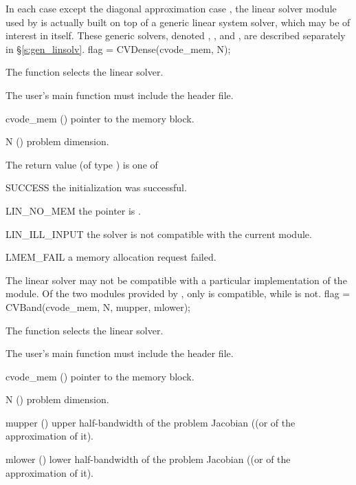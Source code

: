 In each case except the diagonal approximation case {\cvdiag}, the linear
solver module used by {\cvodes} is actually built on top of a generic
linear system solver, which may be of interest in itself.  These
generic solvers, denoted {\dense}, {\band}, and {\spgmr}, are described
separately in \S\ref{s:gen_linsolv}.
{flag = CVDense(cvode\_mem, N);}
{
  The function  selects the {\cvdense} linear solver. 

  The user's main function must include the  header file.
}
{
  \begin{args}
  \item[cvode\_mem] ()
    pointer to the {\cvodes} memory block.
  \item[N] ()
    problem dimension.
  \end{args}
}
{
  The return value  (of type ) is one of
  \begin{args}
  \item[SUCCESS] 
    the {\cvdense} initialization was successful.
  \item[LIN\_NO\_MEM]
    the  pointer is .
  \item[LIN\_ILL\_INPUT]
    the {\cvdense} solver is not compatible with the current {\nvector} module.
  \item[LMEM\_FAIL]
    a memory allocation request failed.
  \end{args}
}
{
  The {\cvdense} linear solver may not be compatible with a particular
  implementation of the {\nvector} module. Of the two {\nvector} modules 
  provided by {\sundials}, only {\nvecs} is compatible, while {\nvecp} is not.
}
{flag = CVBand(cvode\_mem, N, mupper, mlower);}
{
  The function  selects the {\cvband} linear solver. 

  The user's main function must include the  header file.
}
{
  \begin{args}
  \item[cvode\_mem] ()
    pointer to the {\cvodes} memory block.
  \item[N] ()
    problem dimension.
  \item[mupper] ()
    upper half-bandwidth of the problem Jacobian ((or of the approximation of it).
  \item[mlower] ()
    lower half-bandwidth of the problem Jacobian ((or of the approximation of it).
  \end{args}
}

